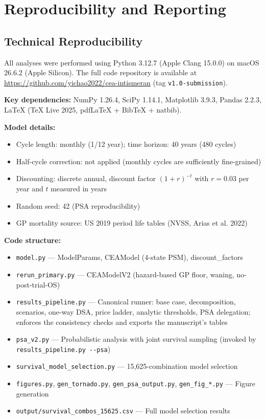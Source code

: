 \documentclass[11pt,a4paper]{article}
\begin{document}
\section{Reproducibility and Reporting}

\subsection{Technical Reproducibility}
\label{sec:tech_repro}
All analyses were performed using Python 3.12.7 (Apple Clang 15.0.0) on macOS 26.6.2 (Apple Silicon). The full code repository is available at \url{https://github.com/yichao2022/cea-intismeran} (tag \texttt{v1.0-submission}).

\textbf{Key dependencies:} NumPy 1.26.4, SciPy 1.14.1, Matplotlib 3.9.3, Pandas 2.2.3, LaTeX (TeX Live 2025, pdfLaTeX + BibTeX + natbib).

\textbf{Model details:}
\begin{itemize}
    \item Cycle length: monthly (1/12 year); time horizon: 40 years (480 cycles)
    \item Half-cycle correction: not applied (monthly cycles are sufficiently fine-grained)
    \item Discounting: discrete annual, discount factor $(1+r)^{-t}$ with $r = 0.03$ per year and $t$ measured in years
    \item Random seed: 42 (PSA reproducibility)
    \item GP mortality source: US 2019 period life tables (NVSS, Arias et al. 2022)
\end{itemize}

\textbf{Code structure:}
\begin{itemize}
    \item \texttt{model.py} --- ModelParams, CEAModel (4-state PSM), discount\_factors
    \item \texttt{rerun\_primary.py} --- CEAModelV2 (hazard-based GP floor, waning, no-post-trial-OS)
    \item \texttt{results\_pipeline.py} --- Canonical runner: base case, decomposition, scenarios, one-way DSA, price ladder, analytic thresholds, PSA delegation; enforces the consistency checks and exports the manuscript's tables
    \item \texttt{psa\_v2.py} --- Probabilistic analysis with joint survival sampling (invoked by \texttt{results\_pipeline.py -{}-psa})
    \item \texttt{survival\_model\_selection.py} --- 15,625-combination model selection
    \item \texttt{figures.py}, \texttt{gen\_tornado.py}, \texttt{gen\_psa\_output.py}, \texttt{gen\_fig\_*.py} --- Figure generation
    \item \texttt{output/survival\_combos\_15625.csv} --- Full model selection results
\end{itemize}
\end{document}
